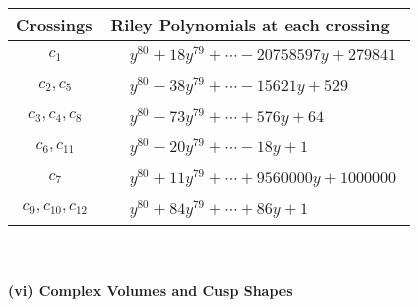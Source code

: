 \documentclass[1p]{elsarticle_modified}
\theoremstyle{definition}
\begin{document}
\begin{tabular}{m{50pt}|m{274pt}}
Crossings & \hspace{64pt}Riley Polynomials at each crossing \\
\hline $$\begin{aligned}c_{1}\end{aligned}$$&$\begin{aligned}
&y^{80}+18 y^{79}+\cdots-20758597 y+279841
\end{aligned}$\\
\hline $$\begin{aligned}c_{2},c_{5}\end{aligned}$$&$\begin{aligned}
&y^{80}-38 y^{79}+\cdots-15621 y+529
\end{aligned}$\\
\hline $$\begin{aligned}c_{3},c_{4},c_{8}\end{aligned}$$&$\begin{aligned}
&y^{80}-73 y^{79}+\cdots+576 y+64
\end{aligned}$\\
\hline $$\begin{aligned}c_{6},c_{11}\end{aligned}$$&$\begin{aligned}
&y^{80}-20 y^{79}+\cdots-18 y+1
\end{aligned}$\\
\hline $$\begin{aligned}c_{7}\end{aligned}$$&$\begin{aligned}
&y^{80}+11 y^{79}+\cdots+9560000 y+1000000
\end{aligned}$\\
\hline $$\begin{aligned}c_{9},c_{10},c_{12}\end{aligned}$$&$\begin{aligned}
&y^{80}+84 y^{79}+\cdots+86 y+1
\end{aligned}$\\
\hline
\end{tabular}\\~\\
\newpage\flushleft \textbf{(vi) Complex Volumes and Cusp Shapes}
\end{document}
